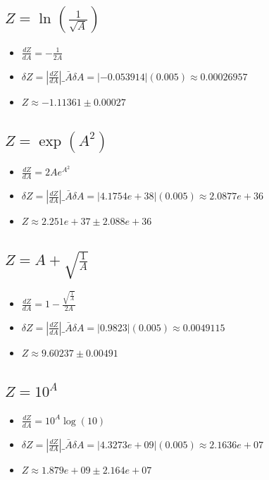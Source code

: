 \documentclass[12pt]{exam}
\begin{document}
\subsection{$Z = \ln(\frac{1}{\sqrt{A}})$}
\begin{itemize}
\item $\frac{dZ}{dA} = - \frac{1}{2 A}$
\item $\delta Z = \left|\frac{dZ}{dA}\right|\_{\bar{A}} \delta A = |-0.053914|(0.005) \approx 0.00026957$
\item $Z \approx -1.11361 \pm 0.00027$
\end{itemize}
\vspace{0.5cm}

\subsection{$Z = \exp(A^2)$}
\begin{itemize}
\item $\frac{dZ}{dA} = 2 A e^{A^{2}}$
\item $\delta Z = \left|\frac{dZ}{dA}\right|\_{\bar{A}} \delta A = |4.1754e+38|(0.005) \approx 2.0877e+36$
\item $Z \approx 2.251e+37 \pm 2.088e+36$
\end{itemize}
\vspace{0.5cm}

\subsection{$Z = A + \sqrt{\frac{1}{A}}$}
\begin{itemize}
\item $\frac{dZ}{dA} = 1 - \frac{\sqrt{\frac{1}{A}}}{2 A}$
\item $\delta Z = \left|\frac{dZ}{dA}\right|\_{\bar{A}} \delta A = |0.9823|(0.005) \approx 0.0049115$
\item $Z \approx 9.60237 \pm 0.00491$
\end{itemize}
\vspace{0.5cm}

\subsection{$Z = 10^A$}
\begin{itemize}
\item $\frac{dZ}{dA} = 10^{A} \log{\left(10 \right)}$
\item $\delta Z = \left|\frac{dZ}{dA}\right|\_{\bar{A}} \delta A = |4.3273e+09|(0.005) \approx 2.1636e+07$
\item $Z \approx 1.879e+09 \pm 2.164e+07$
\end{itemize}
\vspace{0.5cm}
\end{document}
